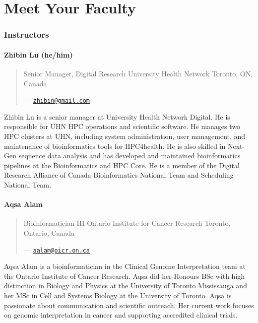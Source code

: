 \documentclass[
]{book}
\begin{document}
\chapter{Meet Your Faculty}\label{meet-your-faculty}

\subsection{Instructors}\label{instructors}

\subsubsection{Zhibin Lu (he/him)}\label{zhibin-lu-hehim}

\begin{quote}
Senior Manager, Digital Research
University Health Network
Toronto, ON, Canada

--- \href{mailto:zhibin@gmail.com}{\nolinkurl{zhibin@gmail.com}}
\end{quote}

Zhibin Lu is a senior manager at University Health Network Digital. He is responsible for UHN HPC operations and scientific software. He manages two HPC clusters at UHN, including system administration, user management, and maintenance of bioinformatics tools for HPC4health. He is also skilled in Next-Gen sequence data analysis and has developed and maintained bioinformatics pipelines at the Bioinformatics and HPC Core. He is a member of the Digital Research Alliance of Canada Bioinformatics National Team and Scheduling National Team.

\subsubsection{Aqsa Alam}\label{aqsa-alam}

\begin{quote}
Bioinformatician III
Ontario Institute for Cancer Research
Toronto, Ontario, Canada

--- \href{mailto:aalam@oicr.on.ca}{\nolinkurl{aalam@oicr.on.ca}}
\end{quote}

Aqsa Alam is a bioinformatician in the Clinical Genome Interpretation team at the Ontario Institute of Cancer Research. Aqsa did her Honours BSc with high distinction in Biology and Physics at the University of Toronto Mississauga and her MSc in Cell and Systems Biology at the University of Toronto. Aqsa is passionate about communication and scientific outreach. Her current work focuses on genomic interpretation in cancer and supporting accredited clinical trials.
\end{document}
